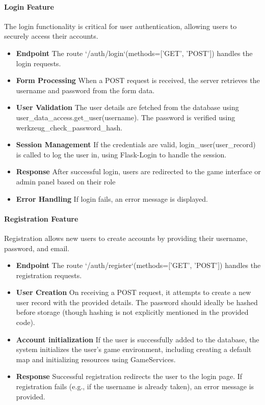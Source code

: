 \documentclass[12pt]{article}
\begin{document}
\paragraph{Login Feature}
The login functionality is critical for user authentication, allowing users to securely access their accounts.
\begin{itemize}
    \item \textbf{Endpoint} The route `/auth/login`(methods=['GET', 'POST']) handles the login requests.
    \item \textbf{Form Processing} When a POST request is received, the server retrieves the username and password from the form data.
    \item \textbf{User Validation} The user details are fetched from the database using user\_data\_access.get\_user(username). The password is verified using werkzeug\_check\_password\_hash.
    \item \textbf{Session Management}  If the credentials are valid, login\_user(user\_record) is called to log the user in, using Flask-Login to handle the session.
    \item \textbf{Response} After successful login, users are redirected to the game interface or admin panel based on their role
    \item \textbf{Error Handling} If login fails, an error message is displayed.
\end{itemize}
\paragraph{Registration Feature}
Registration allows new users to create accounts by providing their username, password, and email.
\begin{itemize}
    \item \textbf{Endpoint} The route `/auth/register`(methods=['GET', 'POST']) handles the registration requests.
    \item \textbf{User Creation} On receiving a POST request, it attempts to create a new user record with the provided details. The password should ideally be hashed before storage (though hashing is not explicitly mentioned in the provided code).
    \item \textbf{Account initialization} If the user is successfully added to the database, the system initializes the user's game environment, including creating a default map and initializing resources using GameServices.
    \item \textbf{Response} Successful registration redirects the user to the login page. If registration fails (e.g., if the username is already taken), an error message is provided.
\end{itemize}
\end{document}
